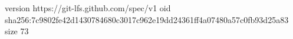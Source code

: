 version https://git-lfs.github.com/spec/v1
oid sha256:7c9802fe42d1430784680c3017c962e19dd24361ff4a07480a57c0fb93d25a83
size 73
